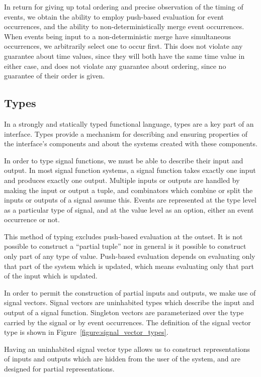 In return for giving up total ordering and precise observation of the timing of events, we obtain the
ability to employ push-based evaluation for event occurrences, and the ability to non-deterministically
merge event occurrences. When events being input to a non-deterministic merge have simultaneous occurrences,
we arbitrarily select one to occur first. This does not violate any guarantee about time values, since
they will both have the same time value in either case, and does not violate any guarantee about ordering,
since no guarantee of their order is given.

\subsection{Types}
\label{subsection:System_Design_and_Interface-Types}

In a strongly and statically typed functional language, types are a key part of
an interface. Types provide a mechanism for describing and ensuring properties
of the interface's components and about the systems created with these
components. 

In order to type signal functions, we must be able to describe their input and
output. In most signal function systems, a signal function takes exactly one
input and produces exactly one output. Multiple inputs or outputs are handled
by making the input or output a tuple, and combinators which combine or split
the inputs or outputs of a signal assume this. Events are represented at the
type level as a particular type of signal, and at the value level as an option,
either an event occurrence or not.

This method of typing excludes push-based evaluation at the outset.
It is not possible to construct a ``partial tuple'' nor in general is it
possible to construct only part of any type of value. Push-based evaluation
depends on evaluating only that part of the system which is updated, which means
evaluating only that part of the input which is updated.

In order to permit the construction of partial inputs and outputs, we make use
of signal vectors. Signal vectors are uninhabited types which describe the input
and output of a signal function. Singleton vectors are parameterized over the
type carried by the signal or by event occurrences. The definition of the signal
vector type is shown in Figure~\ref{figure:signal_vector_types}. 

Having an uninhabited signal vector type allows us to construct representations
of inputs and outputs which are hidden from the user of the system, and are
designed for partial representations.

